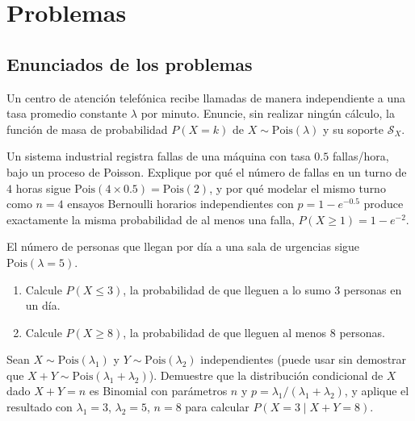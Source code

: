 \section*{Problemas}

\subsection*{Enunciados de los problemas}

\begin{problema}
	\label{prob:06f83cc}
	Un centro de atención telefónica recibe llamadas de manera independiente a una tasa promedio constante $\lambda$ por minuto. Enuncie, sin realizar ningún cálculo, la función de masa de probabilidad $P(X=k)$ de $X\sim\text{Pois}(\lambda)$ y su soporte $\mathcal{S}_X$.
\end{problema}

\begin{problema}
	\label{prob:c35cfa7}
	Un sistema industrial registra fallas de una máquina con tasa $0.5$ fallas/hora, bajo un proceso de Poisson. Explique por qué el número de fallas en un turno de $4$ horas sigue $\text{Pois}(4\times0.5)=\text{Pois}(2)$, y por qué modelar el mismo turno como $n=4$ ensayos Bernoulli horarios independientes con $p=1-e^{-0.5}$ produce exactamente la misma probabilidad de al menos una falla, $P(X\ge1)=1-e^{-2}$.
\end{problema}

\begin{problema}
	\label{prob:8fd3390}
	El número de personas que llegan por día a una sala de urgencias sigue $\text{Pois}(\lambda=5)$.
	\begin{enumerate}
		\item Calcule $P(X\le3)$, la probabilidad de que lleguen a lo sumo $3$ personas en un día.
		\item Calcule $P(X\ge8)$, la probabilidad de que lleguen al menos $8$ personas.
	\end{enumerate}
\end{problema}

\begin{problema}
	\label{prob:8dad711}
	Sean $X\sim\text{Pois}(\lambda_1)$ y $Y\sim\text{Pois}(\lambda_2)$ independientes (puede usar sin demostrar que $X+Y\sim\text{Pois}(\lambda_1+\lambda_2)$). Demuestre que la distribución condicional de $X$ dado $X+Y=n$ es Binomial con parámetros $n$ y $p=\lambda_1/(\lambda_1+\lambda_2)$, y aplique el resultado con $\lambda_1=3$, $\lambda_2=5$, $n=8$ para calcular $P(X=3\mid X+Y=8)$.
\end{problema}

